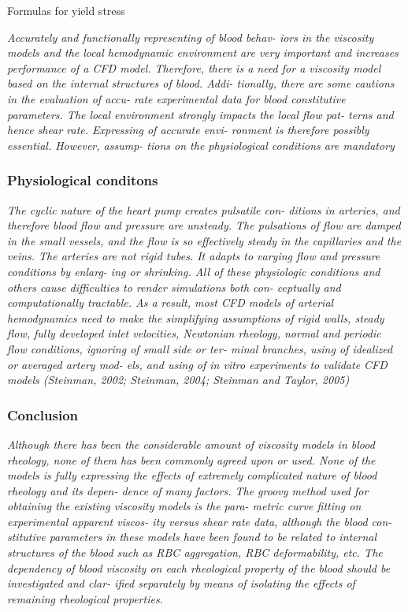 \documentclass[11pt,letterpaper]{article}
\begin{document}
Formulas for yield stress

\textit{Accurately and functionally  representing of blood  behav-
iors  in the viscosity  models and  the local hemodynamic environment  are very important  and increases performance of a CFD model. Therefore, there is a need for a viscosity model based on the  internal structures  of  blood. Addi- tionally, there are  some  cautions  in  the evaluation of accu- rate  experimental data for blood  constitutive parameters. The local environment strongly impacts the local  flow pat- terns and hence shear rate. Expressing of accurate envi- ronment is therefore  possibly  essential. However,  assump- tions on the physiological conditions are mandatory}


\subsubsection*{Physiological conditons}
\textit{The cyclic nature  of the  heart  pump creates  pulsatile con-
ditions in arteries, and therefore blood flow and  pressure are unsteady. The pulsations of  flow  are damped in the small vessels, and the  flow is so effectively  steady in  the capillaries and the veins.  The arteries are not rigid tubes. It adapts to varying flow and pressure  conditions  by  enlarg- ing or shrinking. All of these  physiologic conditions and others cause difficulties to  render simulations  both con- ceptually and computationally tractable. As a result, most CFD  models of arterial  hemodynamics need  to make  the simplifying assumptions of  rigid walls, steady flow, fully developed  inlet velocities, Newtonian rheology,  normal and  periodic flow conditions, ignoring of small side or ter- minal  branches, using  of  idealized or averaged artery  mod- els, and using of in vitro  experiments to validate CFD models (Steinman, 2002; Steinman,  2004; Steinman and Taylor, 2005)}


 \subsubsection*{Conclusion}
\textit{Although there has been  the considerable amount of viscosity models in blood  rheology, none of them  has been commonly agreed upon or used. None of the models is fully expressing the effects of extremely complicated nature of blood  rheology and  its  depen- dence of many factors. The groovy method used for obtaining the existing viscosity models is  the para- metric curve fitting on experimental apparent  viscos- ity versus shear rate  data,  although the  blood con- stitutive parameters in these models have been found to be  related to internal  structures of the blood such  as RBC aggregation, RBC deformability,  etc. The dependency of blood  viscosity on each rheological property of the  blood should  be investigated and  clar- ified separately  by  means of  isolating the effects of remaining rheological properties.}
\end{document}
